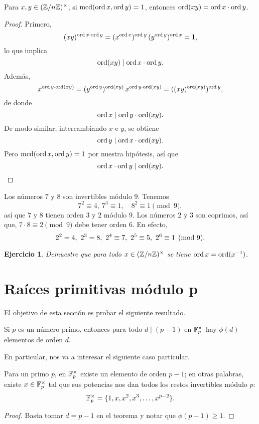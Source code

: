 \documentclass{article}
\theoremstyle{plain}
\newtheorem{ejerc}{Ejercicio}
\begin{document}
\begin{proposicion}
  Para $x,y \in (\mathbb{Z}/n\mathbb{Z})^\times$, si $\operatorname{mcd} (\operatorname{ord} x, \operatorname{ord} y) = 1$, entonces
  $\operatorname{ord} (xy) = \operatorname{ord} x \cdot \operatorname{ord} y$.

  \begin{proof}
    Primero,
    $$(xy)^{\operatorname{ord} x \cdot \operatorname{ord} y} = (x^{\operatorname{ord} x})^{\operatorname{ord} y} \, (y^{\operatorname{ord} y})^{\operatorname{ord} x} = 1,$$
    lo que implica
    $$\operatorname{ord} (xy) \mid \operatorname{ord} x \cdot \operatorname{ord} y.$$
    Además,
    $$x^{\operatorname{ord} y\cdot \operatorname{ord} (xy)} = (y^{\operatorname{ord} y})^{\operatorname{ord} (xy)} \, x^{\operatorname{ord} y\cdot \operatorname{ord} (xy)} = ((xy)^{\operatorname{ord} (xy)})^{\operatorname{ord} y},$$
    de donde
    $$\operatorname{ord} x \mid \operatorname{ord} y\cdot \operatorname{ord} (xy).$$
    De modo similar, intercambiando $x$ e $y$, se obtiene
    $$\operatorname{ord} y \mid \operatorname{ord} x\cdot \operatorname{ord} (xy).$$
    Pero $\operatorname{mcd} (\operatorname{ord} x, \operatorname{ord} y) = 1$ por nuestra hipótesis, así que
    \[ \operatorname{ord} x \cdot \operatorname{ord} y \mid \operatorname{ord} (xy). \qedhere \]
  \end{proof}
\end{proposicion}

\begin{ejemplo}
  Los números $7$ y $8$ son invertibles módulo $9$. Tenemos
  $$7^2 \equiv 4, ~ 7^3 \equiv 1, \quad 8^2 \equiv 1 \pmod{9},$$
  así que $7$ y $8$ tienen orden $3$ y $2$ módulo $9$. Los números $2$ y $3$ son
  coprimos, así que, $7\cdot 8 \equiv 2 \pmod{9}$ debe tener orden $6$. En
  efecto,
  \[ 2^2 = 4, ~ 2^3 = 8, ~ 2^4 \equiv 7, ~
     2^5 \equiv 5, ~ 2^6 \equiv 1 \pmod{9}. \qedhere \]
\end{ejemplo}

\begin{ejerc}
  Demuestre que para todo $x \in (\mathbb{Z}/n\mathbb{Z})^\times$ se tiene
  $\operatorname{ord} x = \operatorname{ord} (x^{-1})$.
\end{ejerc}


\section{Raíces primitivas módulo p}

El objetivo de esta sección es probar el siguiente resultado.

\begin{teorema}
  Si $p$ es un número primo, entonces para todo $d \mid (p-1)$ en $\mathbb{F}_p^\times$
  hay $\phi (d)$ elementos de orden $d$.
\end{teorema}

En particular, nos va a interesar el siguiente caso particular.

\begin{corolario}
  Para un primo $p$, en $\mathbb{F}_p^\times$ existe un elemento de orden $p-1$; en
  otras palabras, existe $x \in \mathbb{F}_p^\times$ tal que sus potencias nos dan
  todos los restos invertibles módulo $p$:
  $$\mathbb{F}_p^\times = \{ 1, x, x^2, x^3, \ldots, x^{p-2} \}.$$

  \begin{proof}
    Basta tomar $d = p-1$ en el teorema y notar que $\phi (p-1) \ge 1$.
  \end{proof}
\end{corolario}
\end{document}
